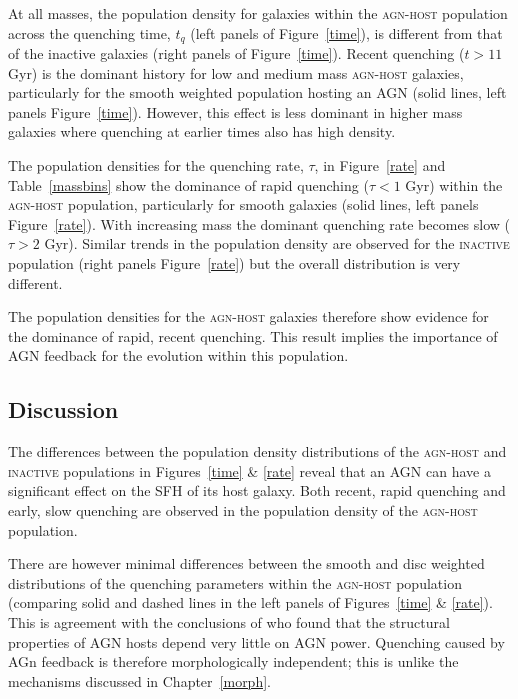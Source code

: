 At all masses, the population density for galaxies within the \textsc{agn-host} population across the quenching time, $t_q$ (left panels of Figure~\ref{time}), is different from that of the inactive galaxies (right panels of Figure~\ref{time}). Recent quenching ($t > 11$ Gyr) is the dominant history for low and medium mass \textsc{agn-host} galaxies, particularly for the smooth weighted population hosting an AGN (solid lines, left panels Figure~\ref{time}). However, this effect is less dominant in higher mass galaxies where quenching at earlier times also has high density.


The population densities for the quenching rate, $\tau$, in Figure~\ref{rate} and Table~\ref{massbins} show the dominance of rapid quenching ($\tau < 1$ Gyr) within the \textsc{agn-host} population, particularly for smooth galaxies (solid lines, left panels Figure~\ref{rate}). With increasing mass the dominant quenching rate becomes slow ($\tau > 2$ Gyr). Similar trends in the population density are observed for the \textsc{inactive} population (right panels Figure~\ref{rate}) but the overall distribution is very different. 


The population densities for the \textsc{agn-host} galaxies therefore show evidence for the dominance of rapid, recent quenching. This result implies the importance of AGN feedback for the evolution within this population.

\subsection{Discussion}\label{dis}

The differences between the population density distributions of the \textsc{agn-host} and \textsc{inactive} populations in Figures~\ref{time} \& \ref{rate} reveal that an AGN can have a significant effect on the SFH of its host galaxy. Both recent, rapid quenching and early, slow quenching are observed in the population density of the \textsc{agn-host} population. 

There are however minimal differences between the smooth and disc weighted distributions of the quenching parameters within the \textsc{agn-host} population (comparing solid and dashed lines in the left panels of Figures~\ref{time} \& \ref{rate}). This is agreement with the conclusions of \citet{kauffmann03b} who found that the structural properties of AGN hosts depend very little on AGN power. Quenching caused by AGn feedback is therefore morphologically independent; this is unlike the mechanisms discussed in Chapter~\ref{morph}.

